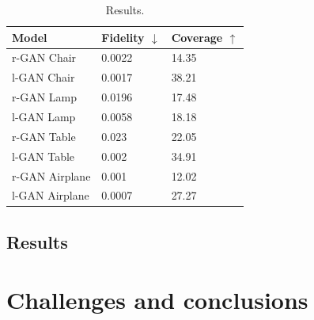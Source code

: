 \documentclass[12pt]{article}
\newcommand{\contentdescription}[1]{}
\begin{document}
    \begin{table}[H]
        \caption{Results.}
        \centering
        \begin{tabular}{lll}
            \toprule
            Model           & Fidelity $\downarrow$ & Coverage $\uparrow$ \\
            \midrule
            r-GAN Chair     & 0.0022                & 14.35               \\
            l-GAN Chair     & 0.0017                & 38.21               \\
            \midrule
            r-GAN Lamp      & 0.0196                & 17.48               \\
            l-GAN Lamp      & 0.0058                & 18.18               \\
            \midrule
            r-GAN Table     & 0.023                 & 22.05               \\
            l-GAN Table     & 0.002                 & 34.91               \\
            \midrule
            r-GAN Airplane & 0.001                & 12.02               \\
            l-GAN Airplane & 0.0007                & 27.27               \\
            \bottomrule
        \end{tabular}
        \label{table:results}
    \end{table}

    \subsection{Results}


    \section{Challenges and conclusions}
    \contentdescription{
        Challenges and Conclusions (5-15\%):
        Challenges you faced when reimplementing the paper and conducting the experiments.
        Were all details in the paper?
        Or did you have to look in the authors code or even contact them to find about some details?
        Was parts of the code quite hard to get them to work as intended?
        Did you have optimize and tune several hyperparameters?
        Which ones?
        Did the framework you used make the implementation difficult in some ways?

        Summarize your key results - what have you learned?
        What points do you think one should consider when using the approach of the paper you chose for your project?
        Suggest ideas for future extensions or new applications of your ideas.
    }
\end{document}
